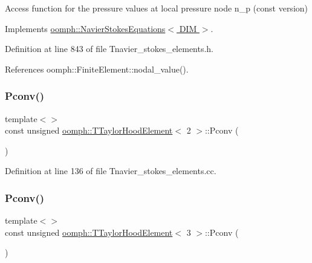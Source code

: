 Access function for the pressure values at local pressure node n\+\_\+p (const version) 



Implements \hyperlink{classoomph_1_1NavierStokesEquations_a0a39f638a61fd9a6c999c16e94deb31b}{oomph\+::\+Navier\+Stokes\+Equations$<$ D\+I\+M $>$}.



Definition at line 843 of file Tnavier\+\_\+stokes\+\_\+elements.\+h.



References oomph\+::\+Finite\+Element\+::nodal\+\_\+value().

\mbox{\label{classoomph_1_1TTaylorHoodElement_ad11f3df045a9c8ecad05f1741d46caa4}} 
\subsubsection{\texorpdfstring{Pconv()}{Pconv()}\hspace{0.1cm}{\footnotesize\ttfamily [1/2]}}
{\footnotesize\ttfamily template$<$$>$ \\
const unsigned \hyperlink{classoomph_1_1TTaylorHoodElement}{oomph\+::\+T\+Taylor\+Hood\+Element}$<$ 2 $>$\+::Pconv (\begin{DoxyParamCaption}{ }\end{DoxyParamCaption})\hspace{0.3cm}{\ttfamily [protected]}}



Definition at line 136 of file Tnavier\+\_\+stokes\+\_\+elements.\+cc.

\mbox{\label{classoomph_1_1TTaylorHoodElement_a294e334fc6a5632417b23ebf37fc7b16}} 
\subsubsection{\texorpdfstring{Pconv()}{Pconv()}\hspace{0.1cm}{\footnotesize\ttfamily [2/2]}}
{\footnotesize\ttfamily template$<$$>$ \\
const unsigned \hyperlink{classoomph_1_1TTaylorHoodElement}{oomph\+::\+T\+Taylor\+Hood\+Element}$<$ 3 $>$\+::Pconv (\begin{DoxyParamCaption}{ }\end{DoxyParamCaption})\hspace{0.3cm}{\ttfamily [protected]}}



